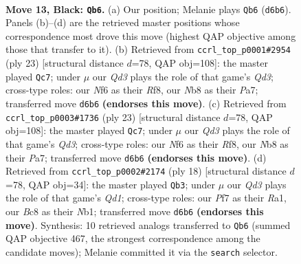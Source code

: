 \documentclass[11pt]{article}
\begin{document}
\clearpage

\begin{figure}[p]\centering
\begin{subfigure}{0.46\textwidth}\centering
\resizebox{\linewidth}{!}{%
\newchessgame
\chessboard[
  setfen={rnb2rk1/1p2bppp/3qpn2/p7/P1PNPP1P/6P1/6B1/RNBQ1RK1 b - - 0 13},
  showmover=false,
  pgfstyle=straightmove, color=movearrow, markmove={d6-b6}
]}
\caption{}
\end{subfigure}\hfill
\begin{subfigure}{0.46\textwidth}\centering
\resizebox{\linewidth}{!}{%
\newchessgame
\chessboard[
  setfen={r1b2rk1/pp2bppp/3qpn2/8/2BN4/2P5/PP3PPP/R1BQR1K1 b - - 0 12},
  showmover=false,
  pgfstyle=straightmove, color=movearrow, markmove={d6-c7}
]}
\caption{}
\end{subfigure}
\\[4pt]
\begin{subfigure}{0.46\textwidth}\centering
\resizebox{\linewidth}{!}{%
\newchessgame
\chessboard[
  setfen={r1b2rk1/pp2bppp/3qpn2/8/2BN4/2P5/PP3PPP/R1BQR1K1 b - - 2 12},
  showmover=false,
  pgfstyle=straightmove, color=movearrow, markmove={d6-c7}
]}
\caption{}
\end{subfigure}\hfill
\begin{subfigure}{0.46\textwidth}\centering
\resizebox{\linewidth}{!}{%
\newchessgame
\chessboard[
  setfen={rnbq1rk1/ppp2nbp/5pp1/4p3/2P1P3/4BN2/PP2BPPP/RN1Q1RK1 w - - 2 10},
  showmover=false,
  pgfstyle=straightmove, color=movearrow, markmove={d1-b3}
]}
\caption{}
\end{subfigure}
\caption{\textbf{Move 13, Black: \texttt{Qb6}.} (a) Our position; Melanie plays \texttt{Qb6} (\texttt{d6b6}). Panels (b)--(d) are the retrieved master positions whose correspondence most drove this move (highest QAP objective among those that transfer to it). (b) Retrieved from \texttt{ccrl\_top\_p0001\#2954} (ply 23) [structural distance $d$=78, QAP obj=108]: the master played \texttt{Qc7}; under $\mu$ our \emph{Qd3} plays the role of that game's \emph{Qd3}; cross-type roles: our \emph{N}f6 as their \emph{R}f8, our \emph{N}b8 as their \emph{P}a7; transferred move \texttt{d6b6} \textbf{(endorses this move)}. (c) Retrieved from \texttt{ccrl\_top\_p0003\#1736} (ply 23) [structural distance $d$=78, QAP obj=108]: the master played \texttt{Qc7}; under $\mu$ our \emph{Qd3} plays the role of that game's \emph{Qd3}; cross-type roles: our \emph{N}f6 as their \emph{R}f8, our \emph{N}b8 as their \emph{P}a7; transferred move \texttt{d6b6} \textbf{(endorses this move)}. (d) Retrieved from \texttt{ccrl\_top\_p0002\#2174} (ply 18) [structural distance $d$=78, QAP obj=34]: the master played \texttt{Qb3}; under $\mu$ our \emph{Qd3} plays the role of that game's \emph{Qd1}; cross-type roles: our \emph{P}f7 as their \emph{R}a1, our \emph{B}c8 as their \emph{N}b1; transferred move \texttt{d6b6} \textbf{(endorses this move)}. Synthesis: 10 retrieved analogs transferred to \texttt{Qb6} (summed QAP objective 467, the strongest correspondence among the candidate moves); Melanie committed it via the \texttt{search} selector.}
\label{fig:thought-m25}
\end{figure}
\end{document}
